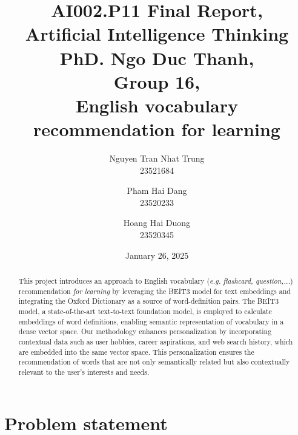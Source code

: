 \documentclass{article}
\title{AI002.P11 Final Report,\\Artificial Intelligence Thinking PhD. Ngo Duc Thanh,\\Group 16,\\ English vocabulary recommendation for learning}
\author{
    Nguyen Tran Nhat Trung \\
    \small 23521684
    \and Pham Hai Dang \\
    \small 23520233
    \and Hoang Hai Duong\\
    \small 23520345
}
\date{January 26, 2025}
\begin{document}
\maketitle

\begin{abstract}
This project introduces an approach to English vocabulary (\textit{e.g. flashcard, question,...}) recommendation \textit{for learning} by leveraging the BEIT3 model for text embeddings and integrating the Oxford Dictionary as a source of word-definition pairs. The BEIT3 model, a state-of-the-art text-to-text foundation model, is employed to calculate embeddings of word definitions, enabling semantic representation of vocabulary in a dense vector space. Our methodology enhances personalization by incorporating contextual data such as user hobbies, career aspirations, and web search history, which are embedded into the same vector space. This personalization ensures the recommendation of words that are not only semantically related but also contextually relevant to the user's interests and needs.
\end{abstract}

\tableofcontents
\newpage


\section{Problem statement}
\end{document}
